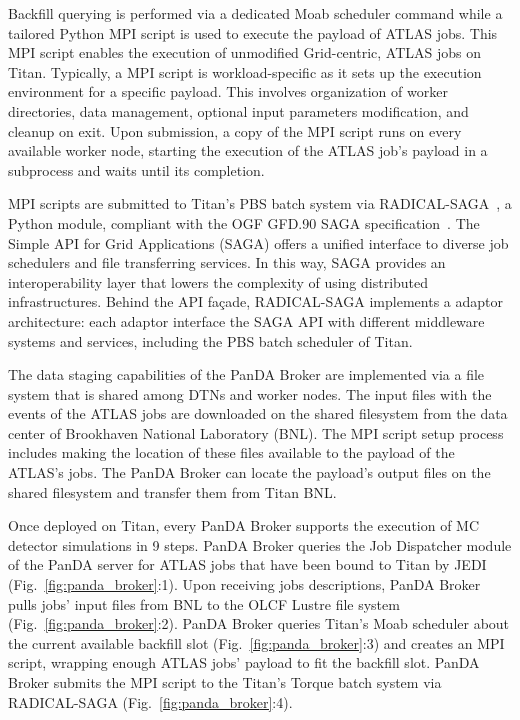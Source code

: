 \documentclass[conference]{IEEEtran}
\begin{document}
Backfill querying is performed via a dedicated Moab scheduler command while a
tailored Python MPI script is used to execute the payload of ATLAS jobs. This
MPI script enables the execution of unmodified Grid-centric, ATLAS jobs on
Titan. Typically, a MPI script is workload-specific as it sets up the execution
environment for a specific payload. This involves organization of worker
directories, data management, optional input parameters modification, and
cleanup on exit. Upon submission, a copy of the MPI script runs on every
available worker node, starting the execution of the ATLAS job's payload in a
subprocess and waits until its completion.

MPI scripts are submitted to Titan's PBS batch system via
RADICAL-SAGA~\cite{radical-saga_url}, a Python module, compliant with the OGF
GFD.90 SAGA specification~\cite{goodale2008simple}. The Simple API for Grid
Applications (SAGA) offers a unified interface to diverse job schedulers and
file transferring services. In this way, SAGA provides an interoperability layer
that lowers the complexity of using distributed infrastructures. Behind the API
façade, RADICAL-SAGA implements a adaptor architecture: each adaptor interface
the SAGA API with different middleware systems and services, including the PBS
batch scheduler of Titan.

The data staging capabilities of the PanDA Broker are implemented via a file
system that is shared among DTNs and worker nodes. The input files with the
events of the ATLAS jobs are downloaded on the shared filesystem from the data
center of Brookhaven National Laboratory (BNL). The MPI script setup process
includes making the location of these files available to the payload of the
ATLAS's jobs. The PanDA Broker can locate the payload's output files on the
shared filesystem and transfer them from Titan BNL.

Once deployed on Titan, every PanDA Broker supports the execution of MC detector
simulations in 9 steps. PanDA Broker queries the Job Dispatcher module of the
PanDA server for ATLAS jobs that have been bound to Titan by JEDI
(Fig.~\ref{fig:panda_broker}:1). Upon receiving jobs descriptions, PanDA Broker
pulls jobs' input files from BNL to the OLCF Lustre file system
(Fig.~\ref{fig:panda_broker}:2). PanDA Broker queries Titan's Moab scheduler
about the current available backfill slot (Fig.~\ref{fig:panda_broker}:3) and
creates an MPI script, wrapping enough ATLAS jobs' payload to fit the backfill
slot. PanDA Broker submits the MPI script to the Titan's Torque batch system via
RADICAL-SAGA (Fig.~\ref{fig:panda_broker}:4).
\end{document}
